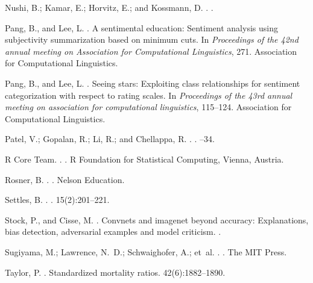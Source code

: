 \documentclass[10pt, conference]{IEEEtran}
\begin{document}
\begin{thebibliography}{1}
Nushi, B.; Kamar, E.; Horvitz, E.; and Kossmann, D.
.
.

Pang, B., and Lee, L.
.
\newblock A sentimental education: Sentiment analysis using subjectivity
  summarization based on minimum cuts.
\newblock In {\em Proceedings of the 42nd annual meeting on Association for
  Computational Linguistics},  271.
\newblock Association for Computational Linguistics.

Pang, B., and Lee, L.
.
\newblock Seeing stars: Exploiting class relationships for sentiment
  categorization with respect to rating scales.
\newblock In {\em Proceedings of the 43rd annual meeting on association for
  computational linguistics},  115--124.
\newblock Association for Computational Linguistics.

Patel, V.; Gopalan, R.; Li, R.; and Chellappa, R.
.
.
--34.

{R Core Team}.
.
.
\newblock R Foundation for Statistical Computing, Vienna, Austria.

Rosner, B.
.
.
\newblock Nelson Education.

Settles, B.
.
.
 15(2):201--221.

Stock, P., and Cisse, M.
.
\newblock Convnets and imagenet beyond accuracy: Explanations, bias detection,
  adversarial examples and model criticism.
.

Sugiyama, M.; Lawrence, N.~D.; Schwaighofer, A.; et~al.
.
.
\newblock The MIT Press.

Taylor, P.
.
\newblock Standardized mortality ratios.
 42(6):1882--1890.

\end{thebibliography}
\end{document}
